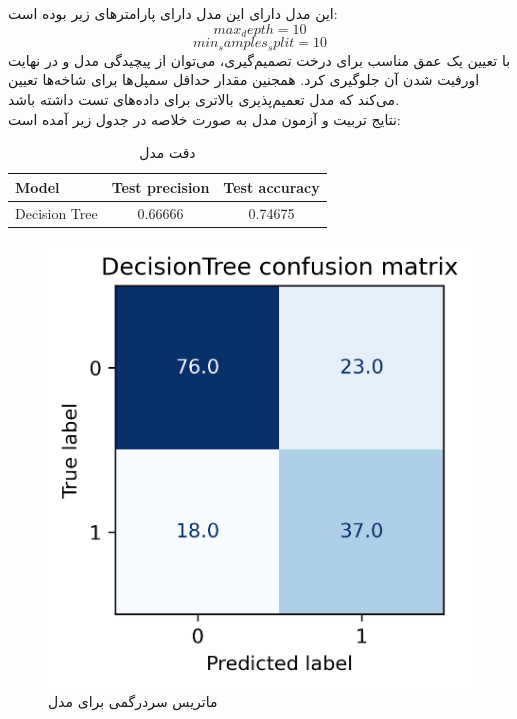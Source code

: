 \documentclass[11pt]{article}
\begin{document}
		\subsection{}
		این مدل دارای این مدل دارای پارامترهای زیر بوده است:
		$$max_depth = 10$$
		$$min_samples_split = 10$$
		با تعیین یک عمق مناسب برای درخت تصمیم‌گیری، می‌توان از پیچیدگی مدل و در نهایت اورفیت شدن آن جلوگیری کرد. همجنین مقدار حداقل سمپل‌ها برای شاخه‌ها تعیین می‌کند که مدل تعمیم‌پذیری بالاتری برای داده‌های تست داشته باشد.\\
		نتایج تربیت و آزمون مدل به صورت خلاصه در جدول زیر آمده است:
		\begin{table}[h!]
			\caption{دقت مدل }
			\begin{latin}
				\centering
				\begin{tabular}{|l|c|c|}
					\hline
					\textbf{Model} & \textbf{Test precision} & \textbf{Test accuracy} \\ \hline
					Decision Tree & 0.66666 & 0.74675 \\ \hline
				\end{tabular}
			\end{latin}
			\label{tab:decisiontree_results}
		\end{table}
		\begin{figure}[!h]
			\centerline{\includegraphics[width=0.5\linewidth]{../HW2_2/DecisionTree confusion.png}}
			\caption{ماتریس سردرگمی برای مدل }
			\label{fig:confusion_decisiontree}
		\end{figure}
		\pagebreak
\end{document}
